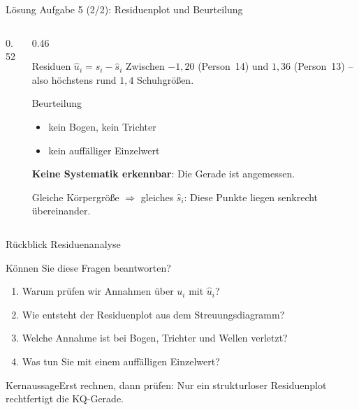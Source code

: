 \documentclass[aspectratio=169,11pt]{beamer}
\newcommand{\kernaussage}[1]{\begin{alertblock}{Kernaussage}#1\end{alertblock}}
\def\koerperresliste{38.7557/0.2443,38.3113/-0.3113,39.6445/-0.6445,46.3105/-0.3105,39.2001/0.7999,39.2001/-0.2001,44.9773/0.0227,37.8669/-0.8669,35.8671/0.1329,41.1999/0.8001,42.3109/0.6891,37.8669/0.1331,39.6445/1.3555,41.1999/-1.1999,39.6445/-0.6445}
\newcommand{\residuenplotvon}[2]{%
  \foreach \px/\py in #1 {%
    \edef\tmpdraw{\noexpand\draw[resred!70, line width=1.2pt, #2] (axis cs:\px,0) -- (axis cs:\px,\py);
      \noexpand\fill[hsbiblue, #2] (axis cs:\px,\py) circle[radius=2.2pt];}%
    \tmpdraw
  }}
\begin{document}
\begin{frame}{Lösung Aufgabe 5 (2/2): Residuenplot und Beurteilung}
  \begin{columns}[T]
    \begin{column}{0.52\textwidth}
    \end{column}
    \begin{column}{0.46\textwidth}
      \small
      \begin{block}{Residuen $\hat{u}_i = s_i - \hat{s}_i$}
        Zwischen $-1{,}20$ (Person~14) und $1{,}36$ (Person~13) -- also höchstens
        rund $1{,}4$ Schuhgrößen.
      \end{block}
      \begin{exampleblock}{Beurteilung}
        \begin{itemize}
          \item kein Bogen, kein Trichter
          \item kein auffälliger Einzelwert
        \end{itemize}
        \textbf{Keine Systematik erkennbar}: Die Gerade ist angemessen.
      \end{exampleblock}
      \footnotesize Gleiche Körpergröße $\Rightarrow$ gleiches $\hat{s}_i$: Diese
      Punkte liegen senkrecht übereinander.
    \end{column}
  \end{columns}
\end{frame}

\begin{frame}{Rückblick Residuenanalyse}
  \begin{block}{Können Sie diese Fragen beantworten?}
    \begin{enumerate}
      \setlength{\itemsep}{3pt}
      \item Warum prüfen wir Annahmen über $u_i$ mit $\hat{u}_i$?
      \item Wie entsteht der Residuenplot aus dem Streuungsdiagramm?
      \item Welche Annahme ist bei Bogen, Trichter und Wellen verletzt?
      \item Was tun Sie mit einem auffälligen Einzelwert?
    \end{enumerate}
  \end{block}

  \medskip

  \kernaussage{Erst rechnen, dann prüfen: Nur ein strukturloser Residuenplot
    rechtfertigt die KQ-Gerade.}
\end{frame}
\end{document}
